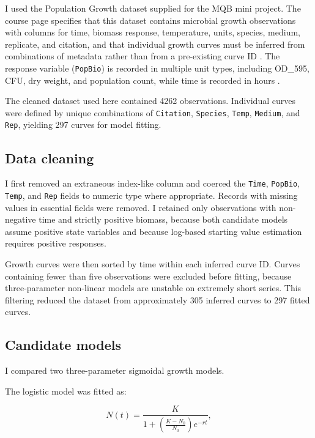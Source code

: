 \documentclass[11pt]{article}
\begin{document}
I used the Population Growth dataset supplied for the MQB mini project. The course page specifies that this dataset contains microbial growth observations with columns for time, biomass response, temperature, units, species, medium, replicate, and citation, and that individual growth curves must be inferred from combinations of metadata rather than from a pre-existing curve ID \citep{MQBMiniProject}. The response variable (\texttt{PopBio}) is recorded in multiple unit types, including OD\_595, CFU, dry weight, and population count, while time is recorded in hours \citep{MQBMiniProject}.

The cleaned dataset used here contained 4262 observations. Individual curves were defined by unique combinations of \texttt{Citation}, \texttt{Species}, \texttt{Temp}, \texttt{Medium}, and \texttt{Rep}, yielding 297 curves for model fitting.

\subsection{Data cleaning}

I first removed an extraneous index-like column and coerced the \texttt{Time}, \texttt{PopBio}, \texttt{Temp}, and \texttt{Rep} fields to numeric type where appropriate. Records with missing values in essential fields were removed. I retained only observations with non-negative time and strictly positive biomass, because both candidate models assume positive state variables and because log-based starting value estimation requires positive responses.

Growth curves were then sorted by time within each inferred curve ID. Curves containing fewer than five observations were excluded before fitting, because three-parameter non-linear models are unstable on extremely short series. This filtering reduced the dataset from approximately 305 inferred curves to 297 fitted curves.

\subsection{Candidate models}

I compared two three-parameter sigmoidal growth models.

The logistic model was fitted as:

\begin{equation}
N(t) = \frac{K}{1 + \left(\frac{K-N_0}{N_0}\right)e^{-rt}},
\end{equation}
\end{document}
